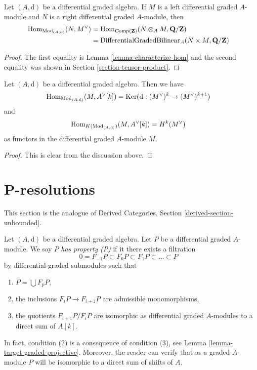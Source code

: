 \begin{lemma}
\label{lemma-map-into-dual}
Let $(A, \text{d})$ be a differential graded algebra. If
$M$ is a left differential graded $A$-module and $N$ is a
right differential graded $A$-module, then
\begin{align*}
\mathop{\mathrm{Hom}}\nolimits_{\text{Mod}_{(A, \text{d})}}(N, M^\vee)
& =
\mathop{\mathrm{Hom}}\nolimits_{\text{Comp}(\mathbf{Z})}(N \otimes_A M, \mathbf{Q}/\mathbf{Z}) \\
& =
\text{DifferentialGradedBilinear}_A(N \times M, \mathbf{Q}/\mathbf{Z})
\end{align*}
\end{lemma}

\begin{proof}
The first equality is Lemma \ref{lemma-characterize-hom}
and the second equality was shown in Section \ref{section-tensor-product}.
\end{proof}

\begin{lemma}
\label{lemma-hom-into-shift-dual-free}
Let $(A, \text{d})$ be a differential graded algebra. Then we have
$$
\mathop{\mathrm{Hom}}\nolimits_{\text{Mod}_{(A, \text{d})}}(M, A^\vee[k]) =
\mathop{\mathrm{Ker}}(\text{d} : (M^\vee)^k \to (M^\vee)^{k + 1})
$$
and
$$
\mathop{\mathrm{Hom}}\nolimits_{K(\text{Mod}_{(A, \text{d})})}(M, A^\vee[k]) = H^k(M^\vee)
$$
as functors in the differential graded $A$-module $M$.
\end{lemma}

\begin{proof}
This is clear from the discussion above.
\end{proof}















\section{P-resolutions}
\label{section-P-resolutions}

\noindent
This section is the analogue of
Derived Categories, Section \ref{derived-section-unbounded}.

\medskip\noindent
Let $(A, \text{d})$ be a differential graded algebra.
Let $P$ be a differential graded $A$-module. We say $P$
{\it has property (P)} if it there exists a filtration
$$
0 = F_{-1}P \subset F_0P \subset F_1P \subset \ldots \subset P
$$
by differential graded submodules such that
\begin{enumerate}
\item $P = \bigcup F_pP$,
\item the inclusions $F_iP \to F_{i + 1}P$ are admissible
monomorphisms,
\item the quotients $F_{i + 1}P/F_iP$ are isomorphic as differential
graded $A$-modules to a direct sum of $A[k]$.
\end{enumerate}
In fact, condition (2) is a consequence of condition (3), see
Lemma \ref{lemma-target-graded-projective}. Moreover, the reader
can verify that as a graded $A$-module $P$ will be isomorphic to a
direct sum of shifts of $A$.

